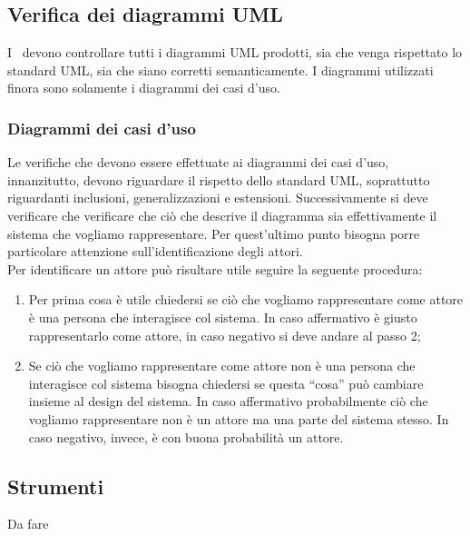 \documentclass[../NormeProgetto.tex]{subfiles}
\begin{document}
			\subsection{Verifica dei diagrammi UML}
			I \verificatori\ devono controllare tutti i diagrammi UML prodotti, sia che venga rispettato lo standard UML, sia che siano corretti semanticamente. I diagrammi utilizzati finora sono solamente i diagrammi dei casi d'uso.
				\subsubsection{Diagrammi dei casi d'uso}
				Le verifiche che devono essere effettuate ai diagrammi dei casi d'uso, innanzitutto, devono riguardare il rispetto dello standard UML, soprattutto riguardanti inclusioni, generalizzazioni e estensioni. Successivamente si deve verificare che verificare che ciò che descrive il diagramma sia effettivamente il sistema che vogliamo rappresentare. Per quest'ultimo punto bisogna porre particolare attenzione sull'identificazione degli attori. \\ Per identificare un attore può risultare utile seguire la seguente procedura:
				\begin{enumerate}
					\item Per prima cosa è utile chiedersi se ciò che vogliamo rappresentare come attore è una persona che interagisce col sistema. In caso affermativo è giusto rappresentarlo come attore, in caso negativo si deve andare al passo 2;
					\item Se ciò che vogliamo rappresentare come attore non è una persona che interagisce col sistema bisogna chiedersi se questa ``cosa'' può cambiare insieme al design del sistema. In caso affermativo probabilmente ciò che vogliamo rappresentare non è un attore ma una parte del sistema stesso. In caso negativo, invece, è con buona probabilità un attore.
				\end{enumerate}
	\subsection{Strumenti} \label{sec:Strumenti}
	Da fare
\end{document}
